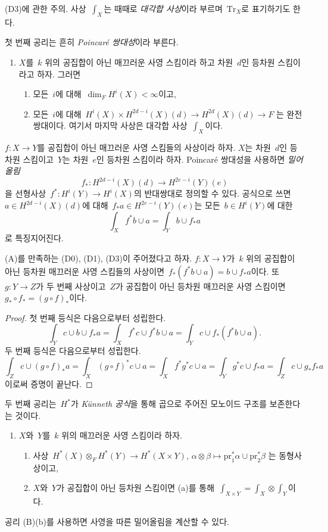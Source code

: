 \medskip\noindent
(D3)에 관한 주의. 사상\  $\int_X$는 때때로 {\it 대각합 사상}이라
부르며\  $\text{Tr}_X$로 표기하기도 한다.

\medskip\noindent
첫 번째 공리는 흔히 {\it Poincar\'e 쌍대성}이라 부른다.
\begin{enumerate}
\item[(A)] $X$를\  $k$ 위의 공집합이 아닌 매끄러운 사영 스킴이라 하고
차원\  $d$인 등차원 스킴이라고 하자. 그러면
\begin{enumerate}
\item 모든\  $i$에 대해\  $\dim_F H^i(X) < \infty$이고,
\item 모든\  $i$에 대해\ 
$H^i(X) \times H^{2d - i}(X)(d) \rightarrow
H^{2d}(X)(d) \rightarrow F$
는 완전쌍대이다. 여기서 마지막 사상은 대각합 사상\  $\int_X$이다.
\end{enumerate}
\end{enumerate}
$f : X \to Y$를 공집합이 아닌 매끄러운 사영 스킴들의 사상이라 하자.
$X$는 차원\  $d$인 등차원 스킴이고\  $Y$는 차원\  $e$인 등차원 스킴이라
하자. Poincar\'e 쌍대성을 사용하면 {\it 밀어올림}
$$
f_* : H^{2d - i}(X)(d) \longrightarrow H^{2e - i}(Y)(e)
$$
을 선형사상\  $f^* : H^i(Y) \to H^i(X)$의 반대쌍대로 정의할 수 있다.
공식으로 쓰면\  $a \in H^{2d - i}(X)(d)$에 대해\ 
$f_*a \in H^{2e - i}(Y)(e)$는 모든\  $b \in H^i(Y)$에 대한
$$
\int_X f^*b \cup a = \int_Y b \cup f_*a
$$
로 특징지어진다.

\begin{lemma}
\label{lemma-pushforward}
(A)를 만족하는 (D0), (D1), (D3)이 주어졌다고 하자.
$f : X \to Y$가\  $k$ 위의 공집합이 아닌 등차원 매끄러운 사영
스킴들의 사상이면\  $f_*(f^*b \cup a) = b \cup f_*a$이다. 또\ 
$g : Y \to Z$가 두 번째 사상이고\  $Z$가 공집합이 아닌 등차원
매끄러운 사영 스킴이면\  $g_* \circ f_* = (g \circ f)_*$이다.
\end{lemma}

\begin{proof}
첫 번째 등식은 다음으로부터 성립한다.
$$
\int_Y c \cup b \cup f_*a =
\int_X f^*c \cup f^*b \cup a =
\int_Y c \cup f_*(f^*b \cup a).
$$
두 번째 등식은 다음으로부터 성립한다.
$$
\int_Z c \cup (g \circ f)_*a = \int_X (g \circ f)^*c \cup a =
\int_X f^* g^* c \cup a = \int_Y g^*c \cup f_*a = \int_Z c \cup g_*f_*a
$$
이로써 증명이 끝난다.
\end{proof}

\noindent
두 번째 공리는\  $H^*$가 {\it K\"unneth 공식}을 통해 곱으로 주어진
모노이드 구조를 보존한다는 것이다.
\begin{enumerate}
\item[(B)] $X$와\  $Y$를\  $k$ 위의 매끄러운 사영 스킴이라 하자.
\begin{enumerate}
\item 사상\  $H^*(X) \otimes_F H^*(Y) \to H^*(X \times Y)$,
$\alpha \otimes \beta \mapsto \text{pr}_1^*\alpha \cup \text{pr}_2^*\beta$
는 동형사상이고,
\item $X$와\  $Y$가 공집합이 아닌 등차원 스킴이면 (a)를 통해\ 
$\int_{X \times Y} = \int_X \otimes \int_Y$이다.
\end{enumerate}
\end{enumerate}
공리 (B)(b)를 사용하면 사영을 따른 밀어올림을 계산할 수 있다.

